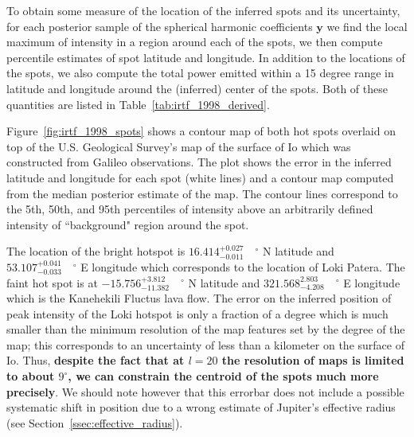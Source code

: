 \documentclass[modern]{aastex62}
\begin{document}
To obtain some measure of the location of the inferred spots and its uncertainty, for each posterior sample of the spherical harmonic coefficients $\mathbf{y}$ we find the local maximum of intensity in a region around each of the spots, we then compute percentile estimates of spot latitude and longitude.
In addition to the locations of the spots, we also compute the total power emitted within a 15 degree range in latitude and longitude around the (inferred) center of the spots.
Both of these quantities are listed in Table~\ref{tab:irtf_1998_derived}. 

Figure~\ref{fig:irtf_1998_spots} shows  a contour map of both hot spots overlaid on top of the U.S. Geological Survey's map of the surface of Io \cite{williams2011} which was constructed from Galileo observations.
The plot shows the error in the inferred latitude and longitude for each spot (white lines) and a contour map computed from the median posterior estimate of the map.
The contour lines correspond to the 5th, 50th, and 95th percentiles of intensity above an arbitrarily defined intensity of ``background" region around the spot.

The location of the bright hotspot is $16.414_{-0.011}^{+0.027}\quad^\circ$ N latitude and $53.107_{-0.033}^{+0.041}\quad^\circ$ E longitude which corresponds to the location of Loki Patera.
The faint hot spot is at $-15.756_{-11.382}^{+3.812}\quad ^\circ$ N latitude and $321.568_{-4.208}^{2.803}\quad^\circ$ E longitude which is the Kanehekili Fluctus lava flow.
The error on the inferred position of peak intensity of the Loki hotspot is only a fraction of a degree which is much smaller than the minimum resolution of the map features set by the degree of the map; this corresponds to an uncertainty of less than a kilometer on the surface of Io.
Thus, \textbf{despite the fact that at $l=20$ the resolution of maps is limited to about $9^\circ$, we can constrain the centroid of the spots much more precisely}.
We should note however that this errorbar does not include a possible systematic shift in position due to a wrong estimate of Jupiter's effective radius (see Section~\ref{ssec:effective_radius}).
\end{document}
